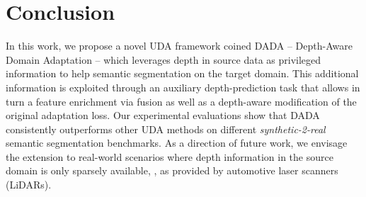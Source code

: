 \documentclass[10pt,twocolumn,letterpaper]{article}
\begin{document}
	\section{Conclusion}
	In this work, we propose a novel UDA framework coined DADA -- Depth-Aware Domain Adaptation -- which leverages depth in source data as privileged information to help semantic  segmentation  on the target domain. This additional information is exploited through an auxiliary depth-prediction task that allows in turn a feature enrichment via fusion as well as a depth-aware modification of the original adaptation loss. Our experimental evaluations show that DADA consistently outperforms other UDA methods on different \textit{synthetic-2-real} semantic segmentation benchmarks. As a direction of future work, we envisage the extension to real-world scenarios where depth information in the source domain is only sparsely available, \eg, as provided by automotive laser scanners (LiDARs).  	
	
	{\small
		
		
	}
	
\end{document}
